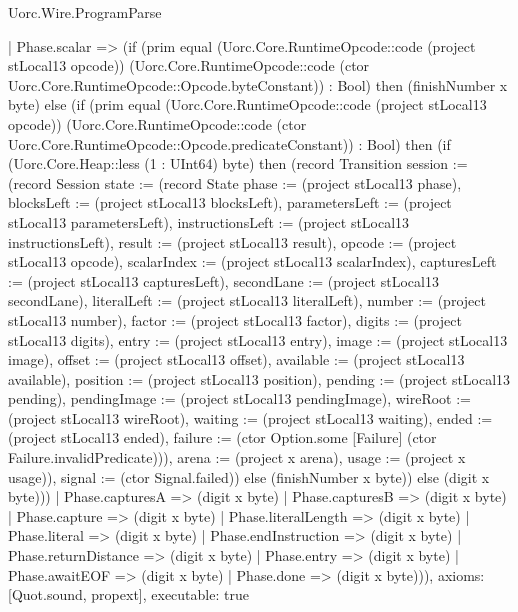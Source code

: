 \begin{lexlean}{Uorc.Wire.ProgramParse}
\begin{semanticmodule}
{    | Phase.scalar => (if (prim equal (Uorc.Core.RuntimeOpcode::code (project stLocal13 opcode)) (Uorc.Core.RuntimeOpcode::code (ctor Uorc.Core.RuntimeOpcode::Opcode.byteConstant)) : Bool) then (finishNumber x byte) else (if (prim equal (Uorc.Core.RuntimeOpcode::code (project stLocal13 opcode)) (Uorc.Core.RuntimeOpcode::code (ctor Uorc.Core.RuntimeOpcode::Opcode.predicateConstant)) : Bool) then (if (Uorc.Core.Heap::less (1 : UInt64) byte) then (record Transition {session := (record Session {state := (record State {phase := (project stLocal13 phase), blocksLeft := (project stLocal13 blocksLeft), parametersLeft := (project stLocal13 parametersLeft), instructionsLeft := (project stLocal13 instructionsLeft), result := (project stLocal13 result), opcode := (project stLocal13 opcode), scalarIndex := (project stLocal13 scalarIndex), capturesLeft := (project stLocal13 capturesLeft), secondLane := (project stLocal13 secondLane), literalLeft := (project stLocal13 literalLeft), number := (project stLocal13 number), factor := (project stLocal13 factor), digits := (project stLocal13 digits), entry := (project stLocal13 entry), image := (project stLocal13 image), offset := (project stLocal13 offset), available := (project stLocal13 available), position := (project stLocal13 position), pending := (project stLocal13 pending), pendingImage := (project stLocal13 pendingImage), wireRoot := (project stLocal13 wireRoot), waiting := (project stLocal13 waiting), ended := (project stLocal13 ended), failure := (ctor Option.some [Failure] (ctor Failure.invalidPredicate))}), arena := (project x arena), usage := (project x usage)}), signal := (ctor Signal.failed)}) else (finishNumber x byte)) else (digit x byte)))
    | Phase.capturesA => (digit x byte)
    | Phase.capturesB => (digit x byte)
    | Phase.capture => (digit x byte)
    | Phase.literalLength => (digit x byte)
    | Phase.literal => (digit x byte)
    | Phase.endInstruction => (digit x byte)
    | Phase.returnDistance => (digit x byte)
    | Phase.entry => (digit x byte)
    | Phase.awaitEOF => (digit x byte)
    | Phase.done => (digit x byte))),
  axioms: [Quot.sound, propext],
  executable: true
}


\end{semanticmodule}
\end{lexlean}
